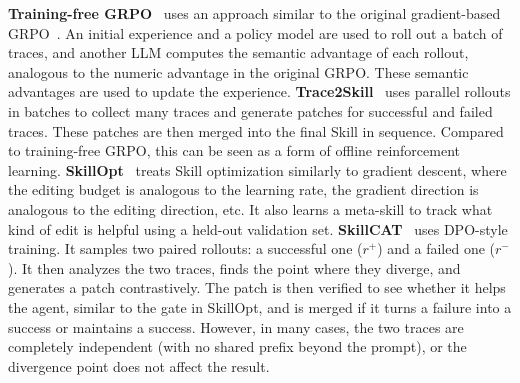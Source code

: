 \textbf{Training-free GRPO}~\cite{_251008191_} uses an approach similar to the original gradient-based GRPO~\cite{shao_deepseekmath_2024}. An initial experience and a policy model are used to roll out a batch of traces, and another LLM computes the semantic advantage of each rollout, analogous to the numeric advantage in the original GRPO. These semantic advantages are used to update the experience. \textbf{Trace2Skill}~\cite{ni_trace2skill_2026} uses parallel rollouts in batches to collect many traces and generate patches for successful and failed traces. These patches are then merged into the final Skill in sequence. Compared to training-free GRPO, this can be seen as a form of offline reinforcement learning. \textbf{SkillOpt}~\cite{yang_skillopt_2026} treats Skill optimization similarly to gradient descent, where the editing budget is analogous to the learning rate, the gradient direction is analogous to the editing direction, etc. It also learns a meta-skill to track what kind of edit is helpful using a held-out validation set. \textbf{SkillCAT}~\cite{chen_skillcat_2026} uses DPO-style training. It samples two paired rollouts: a successful one ($r^+$) and a failed one ($r^-$). It then analyzes the two traces, finds the point where they diverge, and generates a patch contrastively. The patch is then verified to see whether it helps the agent, similar to the gate in SkillOpt, and is merged if it turns a failure into a success or maintains a success. However, in many cases, the two traces are completely independent (with no shared prefix beyond the prompt), or the divergence point does not affect the result.
